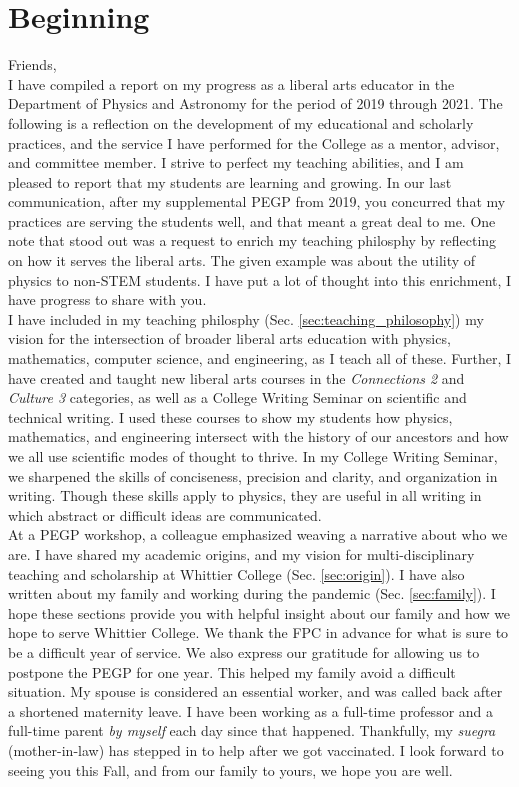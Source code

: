 \documentclass[../../main.tex]{subfiles}
\begin{document}
\section{Beginning}

Friends,
\\
\vspace{0.25cm}
I have compiled a report on my progress as a liberal arts educator in the Department of Physics and Astronomy for the period of 2019 through 2021.  The following is a reflection on the development of my educational and scholarly practices, and the service I have performed for the College as a mentor, advisor, and committee member.  I strive to perfect my teaching abilities, and I am pleased to report that my students are learning and growing.  In our last communication, after my supplemental PEGP from 2019, you concurred that my practices are serving the students well, and that meant a great deal to me.  One note that stood out was a request to enrich my teaching philosphy by reflecting on how it serves the liberal arts.  The given example was about the utility of physics to non-STEM students.  I have put a lot of thought into this enrichment, I have progress to share with you.
\\
\vspace{0.25cm}
I have included in my teaching philosphy (Sec. \ref{sec:teaching_philosophy}) my vision for the intersection of broader liberal arts education with physics, mathematics, computer science, and engineering, as I teach all of these.  Further, I have created and taught new liberal arts courses in the \textit{Connections 2} and \textit{Culture 3} categories, as well as a College Writing Seminar on scientific and technical writing.  I used these courses to show my students how physics, mathematics, and engineering intersect with the history of our ancestors and how we all use scientific modes of thought to thrive.  In my College Writing Seminar, we sharpened the skills of conciseness, precision and clarity, and organization in writing.  Though these skills apply to physics, they are useful in all writing in which abstract or difficult ideas are communicated.
\\
\vspace{0.25cm}
At a PEGP workshop, a colleague emphasized weaving a narrative about who we are.  I have shared my academic origins, and my vision for multi-disciplinary teaching and scholarship at Whittier College (Sec. \ref{sec:origin}).  I have also written about my family and working during the pandemic (Sec. \ref{sec:family}).  I hope these sections provide you with helpful insight about our family and how we hope to serve Whittier College.  We thank the FPC in advance for what is sure to be a difficult year of service.  We also express our gratitude for allowing us to postpone the PEGP for one year.  This helped my family avoid a difficult situation.  My spouse is considered an essential worker, and was called back after a shortened maternity leave.  I have been working as a full-time professor and a full-time parent \textit{by myself} each day since that happened.  Thankfully, my \textit{suegra} (mother-in-law) has stepped in to help after we got vaccinated.  I look forward to seeing you this Fall, and from our family to yours, we hope you are well.
\end{document}
